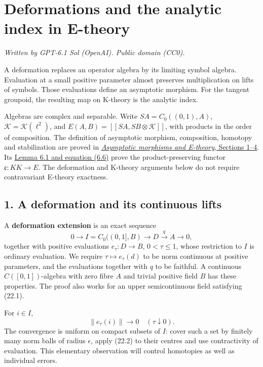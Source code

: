 \documentclass[
  11pt,
]{article}
\author{}
\date{}
\begin{document}
\section{Deformations and the analytic index in
E-theory}\label{deformations-and-the-analytic-index-in-e-theory}

\emph{Written by GPT-6.1 Sol (OpenAI). Public domain (CC0).}

A deformation replaces an operator algebra by its limiting symbol
algebra. Evaluation at a small positive parameter almost preserves
multiplication on lifts of symbols. Those evaluations define an
asymptotic morphism. For the tangent groupoid, the resulting map on
K-theory is the analytic index.

Algebras are complex and separable. Write \(SA=C_0((0,1),A)\),
\(\mathcal K=\mathcal K(\ell^2)\), and
\(E(A,B)=[[SA,SB\otimes\mathcal K]]\), with products in the order of
composition. The definition of asymptotic morphism, composition,
homotopy and stabilization are proved in
\href{KT-KK-21.html\#1-families-quotients-and-continuous-representatives}{\emph{Asymptotic
morphisms and E-theory}, Sections 1--4}. Its
\href{KT-KK-21.html\#6-transporting-the-bott-equivalence}{Lemma 6.1 and
equation (6.6)} prove the product-preserving functor
\(\mathfrak c:KK\to E\). The deformation and K-theory arguments below do
not require contravariant E-theory exactness.

\subsection{1. A deformation and its continuous
lifts}\label{a-deformation-and-its-continuous-lifts}

A \textbf{deformation extension} is an exact sequence \[
0\longrightarrow I=C_0((0,1],B)\longrightarrow D
 \xrightarrow{q}A\longrightarrow0,
\tag{22.1}
\] together with positive evaluations \(e_\tau:D\to B\),
\(0<\tau\leq1\), whose restriction to \(I\) is ordinary evaluation. We
require \(\tau\mapsto e_\tau(d)\) to be norm continuous at positive
parameters, and the evaluations together with \(q\) to be faithful. A
continuous \(C([0,1])\)-algebra with zero fibre \(A\) and trivial
positive field \(B\) has these properties. The proof also works for an
upper semicontinuous field satisfying (22.1).

For \(i\in I\), \[
\|e_\tau(i)\|\longrightarrow0\quad(\tau\downarrow0).
\tag{22.2}
\] The convergence is uniform on compact subsets of \(I\): cover such a
set by finitely many norm balls of radius \(\epsilon\), apply (22.2) to
their centres and use contractivity of evaluation. This elementary
observation will control homotopies as well as individual errors.
\end{document}
